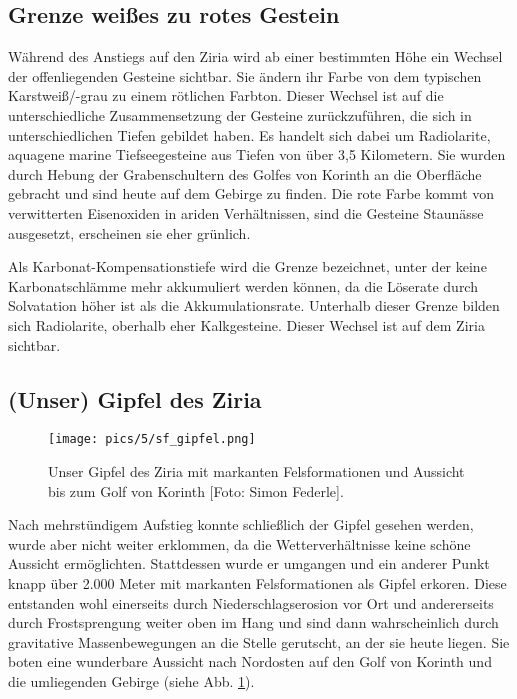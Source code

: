 \documentclass[preprint]{geomorphica} %
\begin{document}
\subsection{Grenze weißes zu rotes Gestein}

Während des Anstiegs auf den Ziria wird ab einer bestimmten Höhe ein Wechsel der offenliegenden Gesteine sichtbar. Sie ändern ihr Farbe von dem typischen Karstweiß/-grau zu einem rötlichen Farbton. Dieser Wechsel ist auf die unterschiedliche Zusammensetzung der Gesteine zurückzuführen, die sich in unterschiedlichen Tiefen gebildet haben. Es handelt sich dabei um Radiolarite, aquagene marine Tiefseegesteine aus Tiefen von über 3,5 Kilometern. Sie wurden durch Hebung der Grabenschultern des Golfes von Korinth an die Oberfläche gebracht und sind heute auf dem Gebirge zu finden. Die rote Farbe kommt von verwitterten Eisenoxiden in ariden Verhältnissen, sind die Gesteine Staunässe ausgesetzt, erscheinen sie eher grünlich. 

Als Karbonat-Kompensationstiefe wird die Grenze bezeichnet, unter der keine Karbonatschlämme mehr akkumuliert werden können, da die Löserate durch Solvatation höher ist als die Akkumulationsrate. Unterhalb dieser Grenze bilden sich Radiolarite, oberhalb eher Kalkgesteine. Dieser Wechsel ist auf dem Ziria sichtbar. 

\subsection{(Unser) Gipfel des Ziria}

\begin{figure}[h]
    \centering
    \texttt{[image: pics/5/sf\_gipfel.png]}
    \caption{Unser Gipfel des Ziria mit markanten Felsformationen und Aussicht bis zum Golf von Korinth [Foto: Simon Federle].}
    \label{pic:ziria}
\end{figure}

Nach mehrstündigem Aufstieg konnte schließlich der Gipfel gesehen werden, wurde aber nicht weiter erklommen, da die Wetterverhältnisse keine schöne Aussicht ermöglichten. Stattdessen wurde er umgangen und ein anderer Punkt knapp über 2.000 Meter mit markanten Felsformationen als Gipfel erkoren. Diese entstanden wohl einerseits durch Niederschlagserosion vor Ort und andererseits durch Frostsprengung weiter oben im Hang und sind dann wahrscheinlich durch gravitative Massenbewegungen an die Stelle gerutscht, an der sie heute liegen. Sie boten eine wunderbare Aussicht nach Nordosten auf den Golf von Korinth und die umliegenden Gebirge (siehe Abb. \ref{pic:ziria}).
\end{document}
